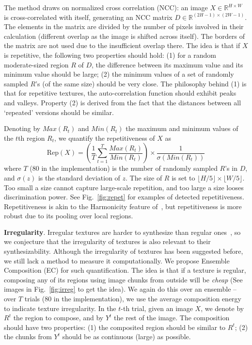 \documentclass[10pt,twocolumn,letterpaper]{article}
\begin{document}
The method draws on normalized cross correlation (NCC): an image $X
\in \mathbb{R}^{H\times W}$ is cross-correlated with itself,
generating an NCC matrix $D\in \mathbb{R}^{(2H-1)\times (2W-1)}$. The
elements in the matrix are divided by the number of pixels involved in
their calculation (different overlap as the image is shifted across
itself). The borders of the matrix are not used due to the insufficient
overlap there. The idea is that  if $X$ is repetitive, the following two
properties should hold: (1) for a random moderate-sized region $R$ of
$D$, the difference between its maximum value and its minimum value
should be large; (2) the minimum values of a set of randomly sampled
$R$'s (of the same size) should be very close.  The philosophy behind
(1) is that for repetitive textures, the auto-correlation function
should exhibit peaks and valleys. Property (2) is derived from the fact
that the distances between all `repeated' versions should be
similar.

Denoting by $Max(R_t)$ and $Min(R_t)$ the maximum and minimum values
of the $t$th region $R_t$, we quantify the repetitiveness of $X$ as
\begin{equation} 
\text{Rep}(X) = \left( \frac{1}{T} \sum_{t=1}^T \frac{Max(R_t)}{Min(R_t)} \right)
                \times \frac{1}{\sigma(Min(R_t))}
\end{equation}
where $T$ ($80$ in the implementation) is the number of randomly
sampled $R$'s in $D$, and $\sigma(z)$ is the standard deviation of
$z$. The size of $R$ is set to $\lfloor H/5 \rfloor \times \lfloor W/5
\rfloor$. Too small a size cannot capture large-scale repetition, and
too large a size looses discrimination power.  See
Fig.~\ref{fig:repet} for examples of detected
repetitiveness. Repetitiveness is akin to the Harmonicity feature
of~\cite{liu:texture:96}, but repetitiveness is more robust due to its
pooling over local regions.

\textbf{Irregularity}. Irregular textures are harder to synthesize
than regular ones~\cite{Liu:2004:NTA}, so we conjecture that the
irregularity of textures is also relevant to their
synthesizability. Although the irregularity of textures has been
suggested before, we still lack a method to measure it
computationally. We propose Ensemble Composition (EC) for such
quantification. The idea is that if a texture is regular, composing
any of its regions using image chunks from outside will be
\emph{cheap} (See images in Fig.~\ref{fig:irreg} to get the idea).  We
again do this over an ensemble -- over $T$ trials ($80$ in the
implementation), we use the average composition energy to indicate
texture irregularity. In the $t$-th trial, given an image $X$, we
denote by $R^t$ the region to compose, and by $Y^t$ the rest of the
image. The composition should have two properties: (1) the composited
region should be similar to $R^t$; (2) the chunks from $Y^t$ should be
as continuous (large) as possible.
\end{document}
